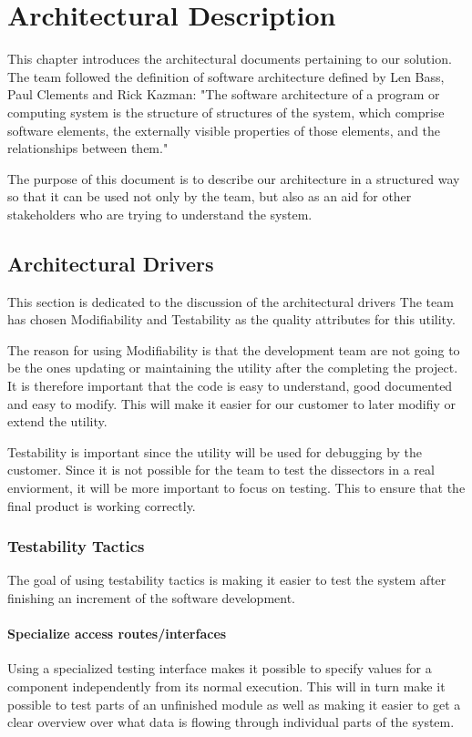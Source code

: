 \chapter{Architectural Description}
This chapter introduces the architectural documents pertaining to our solution. The team followed the definition of software architecture defined by Len Bass, Paul Clements and Rick Kazman: "The software architecture of a program or computing
system is the structure of structures of the system, which comprise software elements, the externally visible properties of those elements, and the relationships between them."

The purpose of this document is to describe our architecture in a structured way so that it can be used not only by the team, but also as an aid for other stakeholders who are trying to understand the system.

\section{Architectural Drivers}
This section is dedicated to the discussion of the architectural drivers
The team has chosen Modifiability and Testability as the quality attributes for this utility. 

The reason for using Modifiability is that the development team are not going to be the ones updating or maintaining the utility after the completing the project. It is therefore important that the code is easy to understand, good documented and easy to modify. This will make it easier for our customer to later modifiy or extend the utility.

Testability is important since the utility will be used for debugging by the customer.  Since it is not possible for the team to test the dissectors in a real enviorment, it will be more important to focus on testing. This to ensure that the final product is working correctly.

\subsection{Testability Tactics}
The goal of using testability tactics is making it easier to test the system after finishing an increment of the software development. 

\subsubsection{Specialize access routes/interfaces}
Using a specialized testing interface makes it possible to specify values for a component independently from its normal execution. This will in turn make it possible to test parts of an unfinished module as well as making it easier to get a clear overview over what data is flowing through individual parts of the system.

